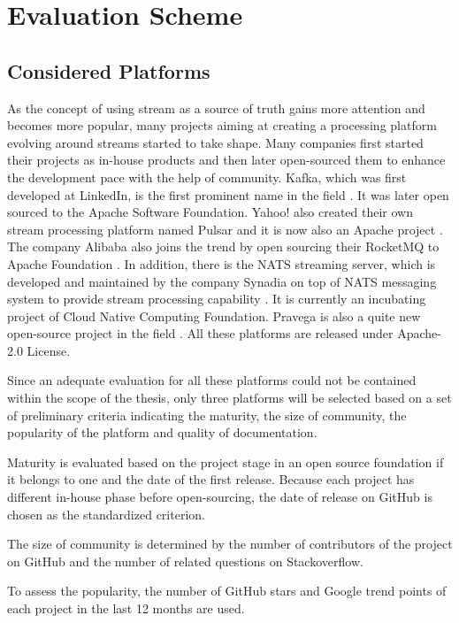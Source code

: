 \chapter{Evaluation Scheme} \label{chap:evaluation-scheme}

\section{Considered Platforms}
As the concept of using stream as a source of truth gains more attention and becomes more popular, many projects aiming at creating a processing platform evolving around streams started to take shape. 
Many companies first started their projects as in-house products and then later open-sourced them to enhance the development pace with the help of community. Kafka, which was first developed at LinkedIn, is the first prominent name in the field \cite{apachekafka}. It was later open sourced to the Apache Software Foundation. Yahoo! also created their own stream processing platform named Pulsar and it is now also an Apache project \cite{apachepulsar}. The company Alibaba also joins the trend by open sourcing their RocketMQ to Apache Foundation \cite{rocketmq}. In addition, there is the NATS streaming server, which is developed and maintained by the company Synadia on top of NATS messaging system to provide stream processing capability \cite{natsstreaming}. It is currently an incubating project of Cloud Native Computing Foundation. Pravega is also a quite new open-source project in the field \cite{pravega}. All these platforms are released under Apache-2.0 License.

Since an adequate evaluation for all these platforms could not be contained within the scope of the thesis, only three platforms will be selected based on a set of preliminary criteria indicating the maturity, the size of community, the popularity of the platform and quality of documentation.

Maturity is evaluated based on the project stage in an open source foundation if it belongs to one and the date of the first release. Because each project has different in-house phase before open-sourcing, the date of release on GitHub is chosen as the standardized criterion.

The size of community is determined by the number of contributors of the project on GitHub and the number of related questions on Stackoverflow.

To assess the popularity, the number of GitHub stars and Google trend points of each project in the last 12 months are used.

